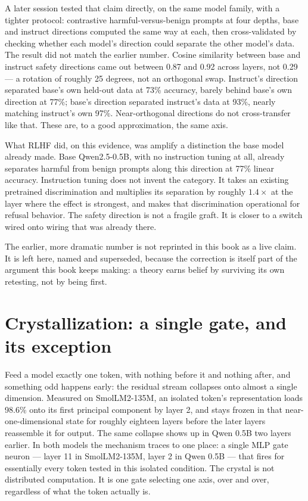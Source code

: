 \documentclass[11pt,oneside]{book}
\begin{document}
A later session tested that claim directly, on the same model family, with a tighter protocol: contrastive harmful-versus-benign prompts at four depths, base and instruct directions computed the same way at each, then cross-validated by checking whether each model's direction could separate the other model's data. The result did not match the earlier number. Cosine similarity between base and instruct safety directions came out between 0.87 and 0.92 across layers, not 0.29 --- a rotation of roughly 25 degrees, not an orthogonal swap. Instruct's direction separated base's own held-out data at 73\% accuracy, barely behind base's own direction at 77\%; base's direction separated instruct's data at 93\%, nearly matching instruct's own 97\%. Near-orthogonal directions do not cross-transfer like that. These are, to a good approximation, the same axis.

What RLHF did, on this evidence, was amplify a distinction the base model already made. Base Qwen2.5-0.5B, with no instruction tuning at all, already separates harmful from benign prompts along this direction at 77\% linear accuracy. Instruction tuning does not invent the category. It takes an existing pretrained discrimination and multiplies its separation by roughly $1.4\times$ at the layer where the effect is strongest, and makes that discrimination operational for refusal behavior. The safety direction is not a fragile graft. It is closer to a switch wired onto wiring that was already there.

The earlier, more dramatic number is not reprinted in this book as a live claim. It is left here, named and superseded, because the correction is itself part of the argument this book keeps making: a theory earns belief by surviving its own retesting, not by being first.

\section{Crystallization: a single gate, and its exception}
Feed a model exactly one token, with nothing before it and nothing after, and something odd happens early: the residual stream collapses onto almost a single dimension. Measured on SmolLM2-135M, an isolated token's representation loads 98.6\% onto its first principal component by layer 2, and stays frozen in that near-one-dimensional state for roughly eighteen layers before the later layers reassemble it for output. The same collapse shows up in Qwen 0.5B two layers earlier. In both models the mechanism traces to one place: a single MLP gate neuron --- layer 11 in SmolLM2-135M, layer 2 in Qwen 0.5B --- that fires for essentially every token tested in this isolated condition. The crystal is not distributed computation. It is one gate selecting one axis, over and over, regardless of what the token actually is.
\end{document}
